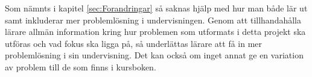 \textcolor{Mahogany}{
    Som nämnts i kapitel \ref{sec:Forandringar} så saknas hjälp med hur man både lär ut samt inkluderar mer problemlösning i undervisningen. Genom att tillhandahålla lärare allmän information kring hur problemen som utformats i detta projekt ska utföras och vad fokus ska ligga på, så underlättas lärare att få in mer problemlösning i sin undervisning. Det kan också om inget annat ge en variation av problem till de som finns i kursboken.
}

